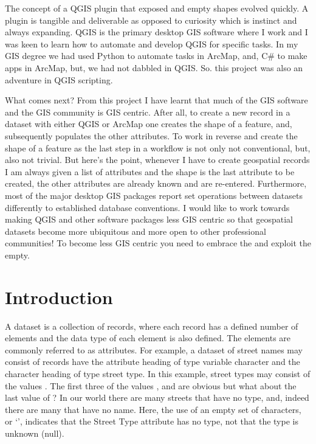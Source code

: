 \documentclass[letterpaper,10pt,english]{sphinxmanual}
\begin{document}
The concept of a QGIS plugin that exposed  and empty shapes evolved quickly.  A plugin is tangible and deliverable as opposed to curiosity which is instinct and always expanding.  QGIS is the primary desktop GIS software where I work and I was keen to learn how to automate and develop QGIS for specific tasks.  In my GIS degree we had used Python to automate tasks in ArcMap, and, C\# to make apps in ArcMap, but, we had not dabbled in QGIS.  So. this project was also an adventure in QGIS scripting.

What comes next?  From this project I have learnt that much of the GIS software and the GIS community is GIS centric.  After all, to create a new record in a dataset with either QGIS or ArcMap one creates the shape of a feature, and, subsequently populates the other attributes.  To work in reverse and create the shape of a feature as the last step in a workflow is not only not conventional, but, also not trivial.  But here’s the point, whenever I have to create geospatial records I am always given a list of attributes and the shape is the last attribute to be created, the other attributes are already known and are re-entered.  Furthermore, most of the major desktop GIS packages report set operations between datasets differently to established database conventions.  I would like to work towards making QGIS and other software packages less GIS centric so that geospatial datasets become more ubiquitous and more open to other professional communities! To become less GIS centric you need to embrace the  and exploit the empty.


\section{Introduction}
\label{\detokenize{concept:introduction}}
A dataset is a collection of records, where each record has a defined number of elements and the data type of each
element is also defined.  The elements are commonly referred to as attributes.  For example, a dataset of street names
may consist of records have the attribute heading  of type variable character and the character heading
 of type street type.  In this example, street types may consist of the values
.  The first three of the values ,  and  are obvious \textendash{} but what about
the last value of ?    In our world there are many streets that
have no type, and, indeed there are many that have no name.  Here, the use of an empty set of characters, or ‘’,
indicates that the Street Type attribute has no type, not that the type is unknown (null).
\end{document}
